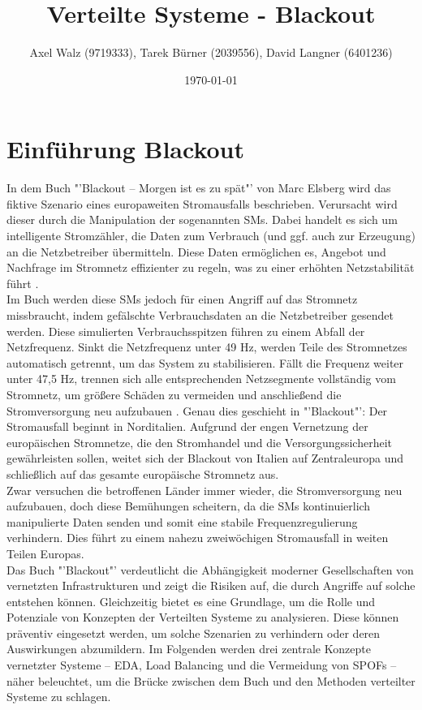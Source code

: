 \documentclass[a4paper,12pt]{article}
\title{Verteilte Systeme - Blackout}
\author{Axel Walz (9719333), Tarek Bürner (2039556), David Langner (6401236)}
\date{\today}
\let\stdsection\section
\renewcommand\section{\newpage\stdsection}
\begin{document}
\onehalfspacing 

\maketitle
{}
\newpage 
\tableofcontents
\newpage
\listoffigures 
\newpage 

\newpage
\pagestyle{plain}


\section{Einführung Blackout}
In dem Buch "'Blackout – Morgen ist es zu spät"' von Marc Elsberg wird das fiktive Szenario eines europaweiten Stromausfalls beschrieben. Verursacht wird dieser durch die Manipulation der sogenannten \acp{SM}. Dabei handelt es sich um intelligente Stromzähler, die Daten zum Verbrauch (und ggf. auch zur Erzeugung) an die Netzbetreiber übermitteln. Diese Daten ermöglichen es, Angebot und Nachfrage im Stromnetz effizienter zu regeln, was zu einer erhöhten Netzstabilität führt \cite{SmartMeter}. \\
Im Buch werden diese \acp{SM} jedoch für einen Angriff auf das Stromnetz missbraucht, indem gefälschte Verbrauchsdaten an die Netzbetreiber gesendet werden. Diese simulierten Verbrauchsspitzen führen zu einem Abfall der Netzfrequenz. Sinkt die Netzfrequenz unter 49 Hz, werden Teile des Stromnetzes automatisch getrennt, um das System zu stabilisieren. Fällt die Frequenz weiter unter 47,5 Hz, trennen sich alle entsprechenden Netzsegmente vollständig vom Stromnetz, um größere Schäden zu vermeiden und anschließend die Stromversorgung neu aufzubauen \cite{Netzfrequenz}. Genau dies geschieht in "'Blackout"': Der Stromausfall beginnt in Norditalien. Aufgrund der engen Vernetzung der europäischen Stromnetze, die den Stromhandel und die Versorgungssicherheit gewährleisten sollen, weitet sich der Blackout von Italien auf Zentraleuropa und schließlich auf das gesamte europäische Stromnetz aus.\\
Zwar versuchen die betroffenen Länder immer wieder, die Stromversorgung neu aufzubauen, doch diese Bemühungen scheitern, da die \acp{SM} kontinuierlich manipulierte Daten senden und somit eine stabile Frequenzregulierung verhindern. Dies führt zu einem nahezu zweiwöchigen Stromausfall in weiten Teilen Europas.\\
Das Buch "'Blackout"' verdeutlicht die Abhängigkeit moderner Gesellschaften von vernetzten Infrastrukturen und zeigt die Risiken auf, die durch Angriffe auf solche entstehen können. Gleichzeitig bietet es eine Grundlage, um die Rolle und Potenziale von Konzepten der Verteilten Systeme zu analysieren. Diese können präventiv eingesetzt werden, um solche Szenarien zu verhindern oder deren Auswirkungen abzumildern. Im Folgenden werden drei zentrale Konzepte vernetzter Systeme – \ac{EDA}, Load Balancing und die Vermeidung von \acp{SPOF} – näher beleuchtet, um die Brücke zwischen dem Buch und den Methoden verteilter Systeme zu schlagen.
\end{document}
